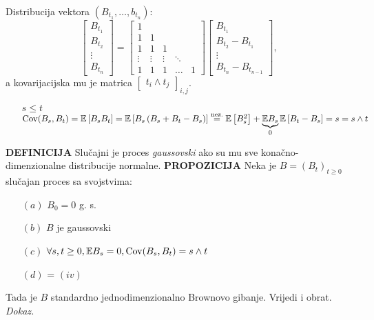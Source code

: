 \documentclass{article}
\newcommand{\Cov}{\operatorname{Cov}}
\begin{document}
Distribucija vektora \(\left(B_{t_1},\ldots,b_{t_n}\right):\) \[\begin{bmatrix}B_{t_1}\\B_{t_2}\\\vdots\\B_{t_n}\end{bmatrix}=\begin{bmatrix}1&&&&\\1&1&&&\\1&1&1&&\\\vdots&\vdots&\vdots&\ddots&\\1&1&1&\ldots&1\end{bmatrix}\begin{bmatrix}B_{t_1}\\B_{t_2}-B_{t_1}\\\vdots\\B_{t_n}-B_{t_{n-1}}\end{bmatrix},\] a kovarijacijska mu je matrica \(\begin{bmatrix}t_i\land t_j\end{bmatrix}_{i,j}.\)
\begin{enumerate}
    \item[\(s\le t\)] \(\Cov(B_s,B_t)=\Bbb E\left[B_sB_t\right]=\Bbb E\left[B_s\left(B_s+B_t-B_s\right)\right]\overset{\text{nez.}}{=}\Bbb E\left[B_s^2\right]+\underbrace{\Bbb EB_s}_0\Bbb E\left[B_t-B_s\right]=s=s\land t\) 
\end{enumerate}
\textbf{DEFINICIJA}\newline
Slučajni je proces \emph{gaussovski} ako su mu sve konačno-dimenzionalne distribucije normalne.\newline\newline
\textbf{PROPOZICIJA}\newline
Neka je \(B=(B_t)_{t\ge0}\) slučajan proces sa svojstvima:
\begin{enumerate}
    \item[\((a)\)] \(B_0=0\) g. s.
    \item[\((b)\)] \(B\) je gaussovski
    \item[\((c)\)] \(\forall s,t\ge0,\Bbb EB_s=0,\Cov(B_s,B_t)=s\land t\)
    \item[\((d)\)] = \((iv)\)
\end{enumerate}
Tada je \(B\) standardno jednodimenzionalno Brownovo gibanje. Vrijedi i obrat.\newline\newline
\textit{Dokaz.}
\end{document}
